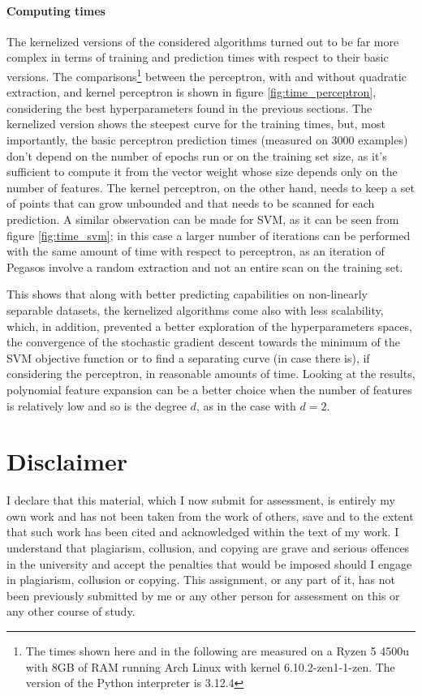 \documentclass{article}
\begin{document}
\paragraph{Computing times}
The kernelized versions of the considered algorithms turned out to be far more complex in terms of training and prediction times with respect to their basic versions. The comparisons\footnote{The times shown here and in the following are measured on a Ryzen 5 4500u with 8GB of RAM running Arch Linux with kernel 6.10.2-zen1-1-zen. The version of the Python interpreter is 3.12.4} between the perceptron, with and without quadratic extraction, and kernel perceptron is shown in figure \ref{fig:time_perceptron}, considering the best hyperparameters found in the previous sections.
The kernelized version shows the steepest curve for the training times, but, most importantly, the basic perceptron prediction times (measured on 3000 examples) don't depend on the number of epochs run or on the training set size, as it's sufficient to compute it from the vector weight whose size depends only on the number of features. The kernel perceptron, on the other hand, needs to keep a set of points that can grow unbounded and that needs to be scanned for each prediction.
A similar observation can be made for SVM, as it can be seen from figure \ref{fig:time_svm}; in this case a larger number of iterations can be performed with the same amount of time with respect to perceptron, as an iteration of Pegasos involve a random extraction and not an entire scan on the training set.

This shows that along with better predicting capabilities on non-linearly separable datasets, the kernelized algorithms come also with less scalability, which, in addition, prevented a better exploration of the hyperparameters spaces, the convergence of the stochastic gradient descent towards the minimum of the SVM objective function or to find a separating curve (in case there is), if considering the perceptron, in reasonable amounts of time. Looking at the results, polynomial feature expansion can be a better choice when the number of features is relatively low and so is the degree $d$, as in the case with $d=2$.

\section{Disclaimer}
I declare that this material, which I now submit for assessment, is entirely my own work and has not been taken from the work of others, save and to the extent that such work has been cited and acknowledged within the text of my work. I understand that plagiarism, collusion, and copying are grave and serious offences in the university and accept the penalties that would be imposed should I engage in plagiarism, collusion or copying. This assignment, or any part of it, has not been previously submitted by me or any other person for assessment on this or any other course of study.	
\end{document}
